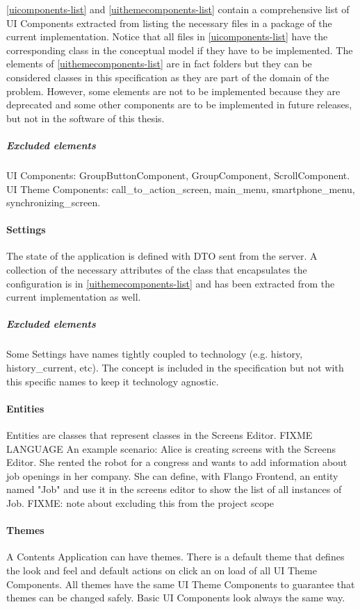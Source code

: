 \ref{uicomponents-list} and \ref{uithemecomponents-list} contain a comprehensive list of UI Components extracted from listing the necessary files in a package of the current implementation.
Notice that all files in \ref{uicomponents-list} have the corresponding class in the conceptual model if they have to be implemented.
The elements of \ref{uithemecomponents-list} are in fact folders but they can be considered classes in this specification as they are part of the domain of the problem.
However, some elements are not to be implemented because they are deprecated and some other components are to be implemented in future releases, but not in the software of this thesis.

\subparagraph{Excluded elements} UI Components: GroupButtonComponent, GroupComponent, ScrollComponent. UI Theme Components: call\_to\_action\_screen, main\_menu, smartphone\_menu, synchronizing\_screen.


\paragraph{Settings} The state of the application is defined with \ac{DTO} sent from the server.
A collection of the necessary attributes of the class that encapsulates the configuration is in \ref{uithemecomponents-list} and has been extracted from the current implementation as well.
\subparagraph{Excluded elements} Some Settings have names tightly coupled to technology (e.g. history, history\_current, etc). The concept is included in the specification but not with this specific names to keep it technology agnostic.

\paragraph{Entities} Entities are classes that represent classes in the Screens Editor. 
FIXME LANGUAGE An example scenario: Alice is creating screens with the Screens Editor.
She rented the robot for a congress and wants to add information about job openings in her company.
She can define, with Flango Frontend, an entity named "Job" and use it in the screens editor to show the list of all instances of Job.
FIXME: note about excluding this from the project scope

\paragraph{Themes} A Contents Application can have themes.
There is a default theme that defines the look and feel and default actions on click an on load of all UI Theme Components.
All themes have the same UI Theme Components to guarantee that themes can be changed safely.
Basic UI Components look always the same way.

